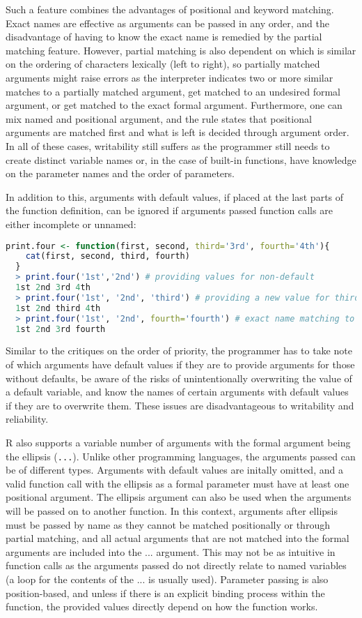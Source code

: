 \documentclass[12pt]{article}
\begin{document}
Such a feature combines the advantages of positional and keyword matching. Exact names are effective as arguments can be passed in any order, and the disadvantage of having to know the exact name is remedied by the partial matching feature. However, partial matching is also dependent on which is similar on the ordering of characters lexically (left to right), so partially matched arguments might raise errors as the interpreter indicates two or more similar matches to a partially matched argument, get matched to an undesired formal argument, or get matched to the exact formal argument. Furthermore, one can mix named and positional argument, and the rule states that positional arguments are matched first and what is left is decided through argument order. In all of these cases, writability still suffers as the programmer still needs to create distinct variable names or, in the case of built-in functions, have knowledge on the parameter names and the order of parameters.

In addition to this, arguments with default values, if placed at the last parts of the function definition, can be ignored if arguments passed function calls are either incomplete or unnamed:

\begin{lstlisting}[language=R ]
  print.four <- function(first, second, third='3rd', fourth='4th'){
    cat(first, second, third, fourth)
  }
  > print.four('1st','2nd') # providing values for non-default
  1st 2nd 3rd 4th
  > print.four('1st', '2nd', 'third') # providing a new value for third
  1st 2nd third 4th
  > print.four('1st', '2nd', fourth='fourth') # exact name matching to fourth
  1st 2nd 3rd fourth
\end{lstlisting}

Similar to the critiques on the order of priority, the programmer has to take note of which arguments have default values if they are to provide arguments for those without defaults, be aware of the risks of unintentionally overwriting the value of a default variable, and know the names of certain arguments with default values if they are to overwrite them. These issues are disadvantageous to writability and reliability.

R also supports a variable number of arguments with the formal argument being the ellipsis (\texttt{...}). Unlike other programming languages, the arguments passed can be of different types. Arguments with default values are initally omitted, and a valid function call with the ellipsis as a formal parameter must have at least one positional argument. The ellipsis argument can also be used when the arguments will be passed on to another function. In this context, arguments after ellipsis must be passed by name as they cannot be matched positionally or through partial matching, and all actual arguments that are not matched into the formal arguments are included into the ... argument. This may not be as intuitive in function calls as the arguments passed do not directly relate to named variables (a loop for the contents of the ... is usually used). Parameter passing is also position-based, and unless if there is an explicit binding process within the function, the provided values directly depend on how the function works.
\end{document}
